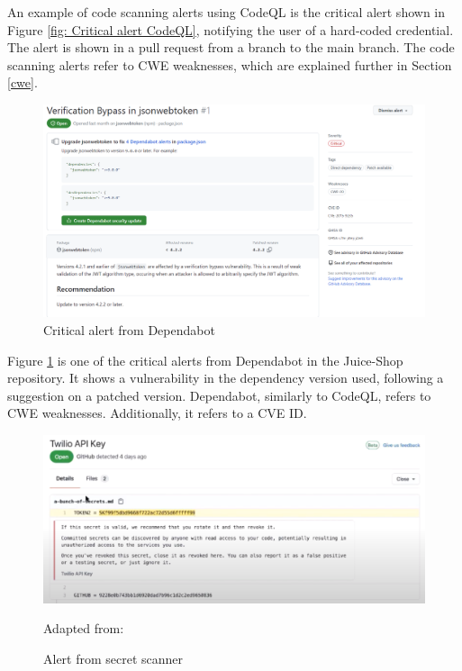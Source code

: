 An example of code scanning alerts using CodeQL is the critical alert shown in Figure \ref{fig: Critical alert CodeQL}, notifying the user of a hard-coded credential. The alert is shown in a pull request from a branch to the main branch. The code scanning alerts refer to CWE weaknesses, which are explained further in Section \ref{cwe}.

\vspace{2mm}
\begin{figure}[H]
    \centering
    \includegraphics[width=0.8\columnwidth]{Images/dependabotalert.png}
    \caption{Critical alert from Dependabot}
    \label{fig: Critical alert from Dependabot}
\end{figure}

Figure \ref{fig: Critical alert from Dependabot} is one of the critical alerts from Dependabot in the Juice-Shop repository. It shows a vulnerability in the dependency version used, following a suggestion on a patched version. Dependabot, similarly to CodeQL, refers to CWE weaknesses. Additionally, it refers to a CVE ID. 

\vspace{2mm}
\begin{figure}[H]
    \centering
    \includegraphics[width=0.8\columnwidth]{Images/secretscanneralert.png}
    \caption{Alert from secret scanner} Adapted from: \cite{GitHubVideo}
    \label{fig: Alert from secret scanner}
\end{figure}


